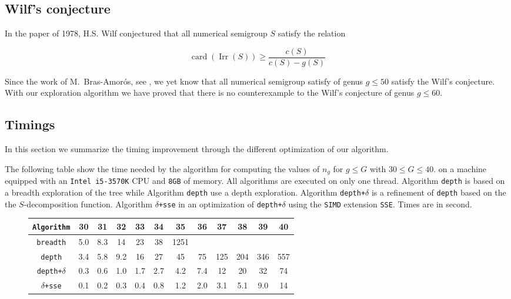 \documentclass[reqno,11pt]{amsart}
\theoremstyle{plain}
\theoremstyle{definition}
\renewcommand{\leq}{\leqslant}
\renewcommand{\geq}{\geqslant}
\newcommand{\SIMD}{\texttt{SIMD}\xspace}
\newcommand{\SSE}{\texttt{SSE}\xspace}
\renewcommand{\tt}[1]{\texttt{#1}}
\DeclareMathOperator{\Irr}{Irr}
\DeclareMathOperator{\card}{card}
\begin{document}
\subsection{Wilf's conjecture}

In the paper \cite{Wilf} of 1978, H.S. Wilf conjectured that all numerical semigroup $S$ satisfy the relation 

\[
\card(\Irr(S))\geq \frac{c(S)}{c(S)-g(S)}
\]

Since the work of M.~Bras-Amor{\'o}s, see \cite{BrasAmoros2008}, we yet know that all numerical semigroup satisfy of genus $g\leq 50$ satisfy the Wilf's conjecture. With our exploration algorithm we have proved that there is no counterexample to the Wilf's conjecture of genus $g\leq 60$.


\subsection{Timings}

In this section we summarize the timing improvement through the different 
optimization of our algorithm. 


The following table show the time needed by the algorithm for computing 
the values of $n_g$ 
for $g\leq G$ with $30\leq G \leq 40$. 
on a machine equipped with  an \tt{Intel\texttrademark{} i5-3570K} CPU 
and \texttt{8GB} of memory.
All algorithms are executed on only one thread. Algorithm \texttt{depth} is 
based on a breadth exploration of the tree while Algorithm \texttt{depth} 
use a depth exploration. Algorithm \texttt{depth+$\delta$} is a refinement of 
\texttt{depth} based on the the $S$-decomposition function. Algorithm 
\texttt{$\delta$+sse} in an optimization of \texttt{depth+$\delta$} using the 
\SIMD extension \SSE. Times are in second.

\begin{figure}[h!]
\begin{tabular}{|c|c|c|c|c|c|c|c|c|c|c|c|}
\hline
\texttt{Algorithm}					&  30 &  31 &  32 &  33 &  34 &   35 &  36 &  37 &  38 &  39 &  40 \\
\hline
\texttt{breadth}		& 5.0 & 8.3 &  14 &  23 &  38 & 1251 &     &     &     &     &     \\
\texttt{depth}			& 3.4 & 5.8 & 9.2 &  16 &  27 &   45 &  75 & 125 & 204 & 346 & 557 \\
\texttt{depth+$\delta$}	& 0.3 & 0.6 & 1.0 & 1.7 & 2.7 &  4.2 & 7.4 &  12 &  20 &  32 & 74  \\
\texttt{$\delta$+sse}	& 0.1 & 0.2 & 0.3 & 0.4 & 0.8 &  1.2 & 2.0 & 3.1 & 5.1 & 9.0 & 14 \\
\hline
\end{tabular}
\end{figure}
\end{document}
